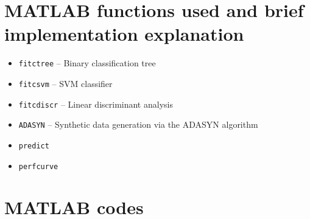 \documentclass{article}
\begin{document}
\begin{appendices}
\section{MATLAB functions used and brief implementation explanation}
\begin{itemize}
	\item \texttt{fitctree} -- Binary classification tree
	\item \texttt{fitcsvm} -- SVM classifier
	\item \texttt{fitcdiscr} -- Linear discriminant analysis
	\item \texttt{ADASYN} -- Synthetic data generation via the ADASYN algorithm
	\item \texttt{predict}
	\item \texttt{perfcurve}
\end{itemize}

\section{MATLAB codes}




\end{appendices}
\end{document}
